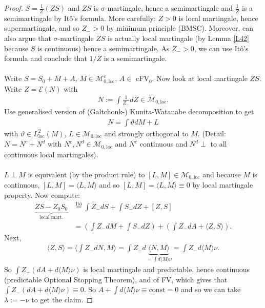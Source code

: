 \documentclass[12pt,a4paper, twoside]{article}
\theoremstyle{definition}
\begin{document}
\begin{proof}
$S= \frac{1}{Z}(ZS)$ and $ZS$ is $\sigma$-martingale, hence a semimartingale and $\frac{1}{Z}$ is a semimartingale by Itô's formula. More carefully: $Z>0$ is local martingale,  hence supermartingale, and so $Z_- >0$ by minimum principle (BMSC). Moreover, can also argue that $\sigma$-martingale $ZS$ is actually local martingale (by Lemma \ref{L42} because $S$ is continuous) hence a semimartingale. As $Z_- >0$, we can use Itô's formula and conclude that $1/Z$ is a semimartingale. 
\\\\
Write $S= S_0 + M + A$, $M \in \mathcal{M}_{0, \text{loc}}^c$, $A \in $ cFV$_0$. Now look at local martingale $ZS$. Write $Z = \mathcal{E}(N)$ with 
\begin{align*}
N:= \int \frac{1}{Z_-}dZ \in \mathcal{M}_{0, \text{loc}}.
\end{align*}
Use generalised version of (Galtchonk-) Kunita-Watanabe decomposition to get 
\begin{align*}
N= \int \vartheta dM + L
\end{align*}
with $\vartheta \in L_\text{loc}^2(M)$, $L \in \mathcal{M}_{0, \text{loc}}$ and strongly orthogonal to $M$. (Detail: $N=N^c +N^d$ with $N^c, N^d \in \mathcal{M}_{0, \text{loc}}$ and $N^c$ continuous and $N^d \perp$ to all continuous local martingales). 
\\\\
$L \perp M$ is equivalent (by the product rule) to $[L,M] \in \mathcal{M}_{0, \text{loc}}$ and because $M$ is continuous, $[L,M]= \langle L, M \rangle$ and so $[L,M] = \langle L,M \rangle \equiv 0$ by local martingale property. Now compute: 
\begin{align*}
\underbrace{ZS-Z_0S_0}_\text{local mart.} & \overset{\text{Itô}}= \int Z_- dS + \int S_- dZ + [Z,S] \\
&= \left( \int Z_- dM + \int S_- dZ \right) + \left( \int Z_- dA + \langle Z,S \rangle \right).
\end{align*}
Next,  
\begin{align*}
\langle Z,S \rangle = \langle \int Z_- d N, M \rangle = \int Z_- d\underbrace{ \langle N, M \rangle}_{= \int d \langle M \rangle \nu} = \int Z_- d \langle M \rangle \nu.
\end{align*}
So $\int Z_- ( dA + d \langle M \rangle \nu)$ is local martingale and predictable, hence continuous (predictable Optional Stopping Theorem), and of FV,  which gives that $ \int Z_- (dA + d \langle M \rangle \nu) \equiv 0$. So $A + \int d \langle M \rangle \nu \equiv \text{const}=0$ and so we can take $\lambda :=- \nu$ to get the claim. 
\end{proof}
\end{document}
